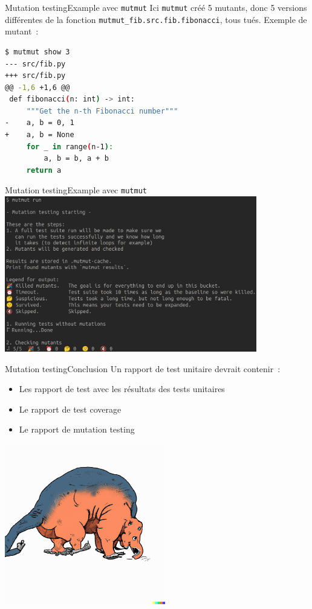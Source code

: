\documentclass{beamer}
\begin{document}
    \begin{frame}[fragile]{Mutation testing}{Example avec \lstinline{mutmut}}
        \transdissolve
        Ici \lstinline{mutmut} créé 5 mutants, donc 5 versions différentes de la fonction \lstinline{mutmut_fib.src.fib.fibonacci}, tous tués.
        \bigbreak
        Exemple de mutant~:
        \begin{lstlisting}[language=bash]
$ mutmut show 3
--- src/fib.py
+++ src/fib.py
@@ -1,6 +1,6 @@
 def fibonacci(n: int) -> int:
     """Get the n-th Fibonacci number"""
-    a, b = 0, 1
+    a, b = None
     for _ in range(n-1):
         a, b = b, a + b
     return a
        \end{lstlisting}
    \end{frame}

    \begin{frame}{Mutation testing}{Example avec \lstinline{mutmut}}
        \transdissolve
        \centering
        \includegraphics[width=11cm]{image/mutmut-result}
    \end{frame}

    \begin{frame}{Mutation testing}{Conclusion}
        \transdissolve
        Un rapport de test unitaire devrait contenir~:
        \begin{itemize}
            \item Les rapport de test avec les résultats des tests unitaires
            \item Le rapport de test coverage
            \item Le rapport de mutation testing
        \end{itemize}
        \centering
        \includegraphics[width=7cm]{image/mutant}
    \end{frame}
\end{document}

